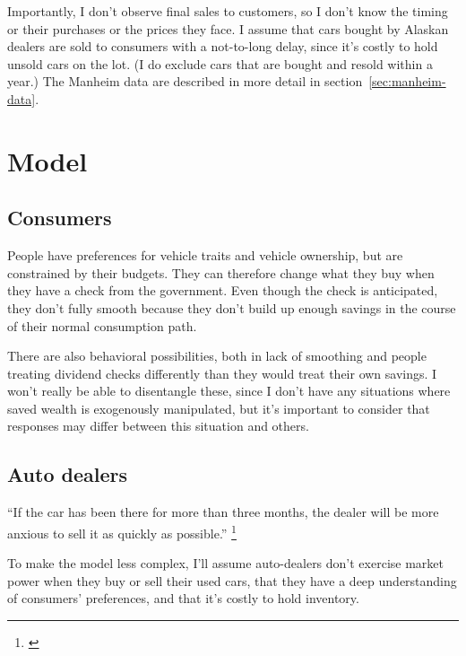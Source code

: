 \documentclass[11pt,letterpaper,oneside]{article}
\begin{document}
Importantly, I don't observe final sales to customers, so I don't know the timing or their purchases or the prices they face.
I assume that cars bought by Alaskan dealers are sold to consumers with a not-to-long delay, since it's costly to hold unsold cars on the lot.
(I do exclude cars that are bought and resold within a year.)
The Manheim data are described in more detail in section~\ref{sec:manheim-data}.



\section{Model}



\subsection{Consumers}


People have preferences for vehicle traits and vehicle ownership, but are constrained by their budgets.
They can therefore change what they buy when they have a check from the government.
Even though the check is anticipated, they don't fully smooth because they don't build up enough savings in the course of their normal consumption path.

There are also behavioral possibilities, both in lack of smoothing and people treating dividend checks differently than they would treat their own savings.
I won't really be able to disentangle these, since I don't have any situations where saved wealth is exogenously manipulated, but it's important to consider that responses may differ between this situation and others.

\subsection{Auto dealers}

``If the car has been there for more than three months, the dealer will be more anxious to sell it as quickly as possible.''%
\footnote{\textcite{usnews_car_deals}} %

To make the model less complex, I'll assume auto-dealers don't exercise market power when they buy or sell their used cars, that they have a deep understanding of consumers' preferences, and that it's costly to hold inventory.
\end{document}
